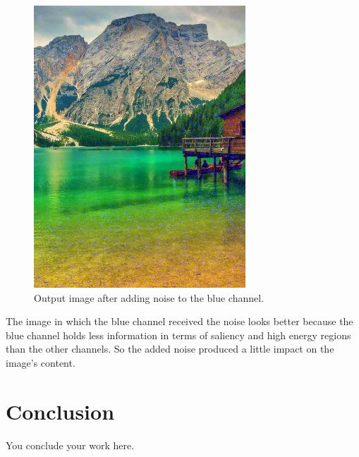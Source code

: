 \documentclass[]{IEEEtran}
\begin{document}
   \begin{figure}[!h]
    \centering
    \includegraphics[width=0.8\hsize]{../output/o-5-b-0.jpg}
    \caption{Output image after adding noise to the blue channel.}
    \label{fig:o-5-b-0}
  \end{figure}
  
  The image in which the blue channel received the noise looks better because the blue channel holds less information in terms of saliency and high energy regions than the other channels. So the added noise produced a little impact on the image's content.
  
  
  \section{Conclusion}
  
  You conclude your work here.
  
\end{document}
